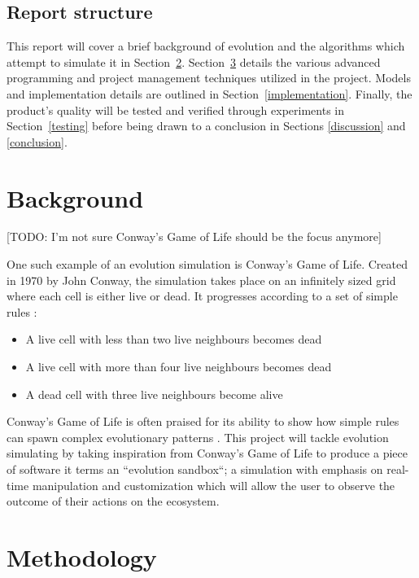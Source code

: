 \documentclass[a4paper, oneside, 11pt]{report}
\begin{document}
\section{Report structure}
This report will cover a brief background of evolution and the algorithms which attempt to simulate it in Section~\ref{background}. Section~\ref{methodology} details the various advanced programming and project management techniques utilized in the project. Models and implementation details are outlined in Section~\ref{implementation}. Finally, the product's quality will be tested and verified through experiments in Section~\ref{testing} before being drawn to a conclusion in Sections \ref{discussion} and \ref{conclusion}.

\chapter{Background}\label{background}
[TODO: I'm not sure Conway's Game of Life should be the focus anymore]

One such example of an evolution simulation is Conway's Game of Life. Created in 1970 by John Conway, the simulation takes place on an infinitely sized grid where each cell is either live or dead. It progresses according to a set of simple rules \cite{guardian}:
\begin{itemize}
	\item A live cell with less than two live neighbours becomes dead
	\item A live cell with more than four live neighbours becomes dead
	\item A dead cell with three live neighbours become alive
\end{itemize}

Conway's Game of Life is often praised for its ability to show how simple rules can spawn complex evolutionary patterns \cite{callahan}. This project will tackle evolution simulating by taking inspiration from Conway's Game of Life to produce a piece of software it terms an ``evolution sandbox``; a simulation with emphasis on real-time manipulation and customization which will allow the user to observe the outcome of their actions on the ecosystem.

\chapter{Methodology}\label{methodology}
\end{document}
